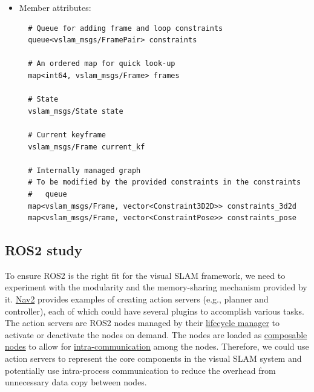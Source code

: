 \begin{itemize}
\begin{itemize}
\begin{lstlisting}
  # Get keyframe service callback
  @\textbf{get\_keyframe\_srv\_callback}@(vslam_msgs/GetKeyFrame)

  # Set keyframe service callback
  @\textbf{set\_keyframe\_srv\_callback}@(vslam_msgs/SetKeyFrame)

  # Get state service callback
  @\textbf{get\_state\_srv\_callback}@(vslam_msgs/GetState)

  # Set state service callback
  @\textbf{set\_state\_srv\_callback}@(vslam_msgs/SetState)

  # Private function
  # Algorithm:
  # constraint $\leftarrow$ pop one constraint from the constraints queue
  # if constraint type is FOR_TRACKING
  #   run local bundle adjustment
  # elif constraint type is FOR_LOOP_CLOSURE
  #   run graph optimization
  @\textbf{optimization\_loop}@()
\end{lstlisting}

    \item Member attributes:
\begin{lstlisting}
  # Queue for adding frame and loop constraints
  queue<vslam_msgs/FramePair> constraints

  # An ordered map for quick look-up
  map<int64, vslam_msgs/Frame> frames

  # State
  vslam_msgs/State state
  
  # Current keyframe
  vslam_msgs/Frame current_kf

  # Internally managed graph
  # To be modified by the provided constraints in the constraints 
  #   queue
  map<vslam_msgs/Frame, vector<Constraint3D2D>> constraints_3d2d 
  map<vslam_msgs/Frame, vector<ConstraintPose>> constraints_pose
\end{lstlisting}
  \end{itemize} 
\end{itemize}








\subsection{ROS2 study}

To ensure ROS2 is the right fit for the visual SLAM framework, we need to experiment with the modularity and the memory-sharing mechanism provided by it.
\href{https://github.com/ros-planning/navigation2}{Nav2} provides examples of creating action servers (e.g., planner and controller), each of which could have several plugins to accomplish various tasks.
The action servers are ROS2 nodes managed by their \href{https://github.com/ros2/demos/blob/humble/lifecycle/README.rst}{lifecycle manager} to activate or deactivate the nodes on demand.
The nodes are loaded as \href{https://docs.ros.org/en/humble/How-To-Guides/Launching-composable-nodes.html}{composable nodes} to allow for \href{https://docs.ros.org/en/humble/Tutorials/Demos/Intra-Process-Communication.html}{intra-communication} among the nodes.
Therefore, we could use action servers to represent the core components in the visual SLAM system and potentially use intra-process communication to reduce the overhead from unnecessary data copy between nodes.
